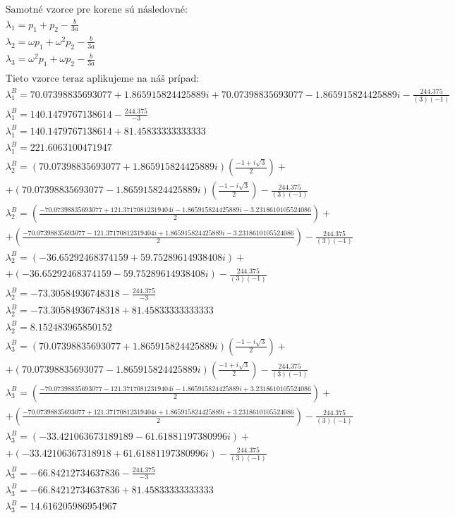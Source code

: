 \documentclass[a4paper]{article}
\begin{document}
	\begin{align*}
		&\text{Samotné vzorce pre korene sú následovné:}
		\\
		&\lambda_1=p_1+p_2-\frac{b}{3a}
		\\
		&\lambda_2=\omega p_1 +\omega^2 p_2 -\frac{b}{3a}
		\\
		&\lambda_3=\omega^2 p_1 +\omega p_2-\frac{b}{3a}
		\\
		\\		
		&\text{Tieto vzorce teraz aplikujeme na náš prípad:}
		\\
		&\lambda_1^B=70.07398835693077 +1.865915824425889 i+70.07398835693077 -1.865915824425889 i-
		\frac{244.375}{(3)(-1)}
		\\
		&\lambda_1^B=140.1479767138614-
		\frac{244.375}{-3}
		\\
		&\lambda_1^B=140.1479767138614+81.45833333333333
		\\
		&\lambda_1^B=221.6063100471947
		\\
		&\lambda_2^B=(70.07398835693077 +1.865915824425889 i)\left(\frac{-1+i\sqrt{3}}{2}\right)+
		\\
		&+(70.07398835693077 -1.865915824425889 i)\left(\frac{-1-i\sqrt{3}}{2}\right)-
		\frac{244.375}{(3)(-1)}
		\\
		&\lambda_2^B=\left(\frac{-70.07398835693077+121.37170812319404 i -1.865915824425889 i -3.2318610105524086}{2}\right)+
		\\
		&+\left(\frac{-70.07398835693077-121.37170812319404 i +1.865915824425889 i -3.2318610105524086}{2}\right)-
		\frac{244.375}{(3)(-1)}
		\\
		&\lambda_2^B=(-36.65292468374159+59.75289614938408i)+
		\\
		&+(-36.65292468374159-59.75289614938408i)-
		\frac{244.375}{(3)(-1)}
		\\
		&\lambda_2^B=-73.30584936748318-
		\frac{244.375}{-3}
		\\
		&\lambda_2^B=-73.30584936748318+81.45833333333333
		\\
		&\lambda_2^B=8.152483965850152
		\\
		&\lambda_3^B=(70.07398835693077 +1.865915824425889 i)\left(\frac{-1-i\sqrt{3}}{2}\right)+
		\\
		&+(70.07398835693077 -1.865915824425889 i)\left(\frac{-1+i\sqrt{3}}{2}\right)-
		\frac{244.375}{(3)(-1)}
		\\
		&\lambda_3^B=\left(\frac{-70.07398835693077-121.37170812319404 i -1.865915824425889 i +3.2318610105524086}{2}\right)+
		\\
		&+\left(\frac{-70.07398835693077+121.37170812319404 i +1.865915824425889 i +3.2318610105524086}{2}\right)-
		\frac{244.375}{(3)(-1)}
		\\
		&\lambda_3^B=(-33.421063673189189-61.61881197380996i)+
		\\
		&+(-33.42106367318918+61.61881197380996i)-
		\frac{244.375}{(3)(-1)}
		\\
		&\lambda_3^B=-66.84212734637836-
		\frac{244.375}{-3}
		\\
		&\lambda_3^B=-66.84212734637836+81.45833333333333
		\\
		&\lambda_3^B=14.616205986954967
	\end{align*}
\end{document}
